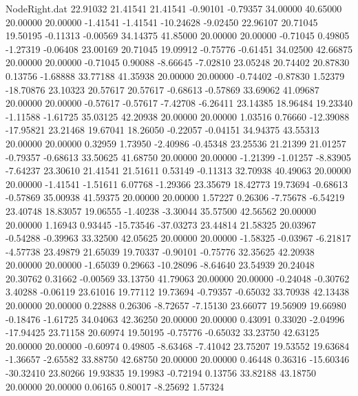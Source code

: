 \begin{filecontents}{NodeRight.dat}
  22.91032   21.41541   21.41541    -0.90101   -0.79357   34.00000   40.65000   20.00000   20.00000   -1.41541   -1.41541  -10.24628   -9.02450
  22.96107   20.71045   19.50195    -0.11313   -0.00569   34.14375   41.85000   20.00000   20.00000   -0.71045    0.49805   -1.27319   -0.06408
  23.00169   20.71045   19.09912    -0.75776   -0.61451   34.02500   42.66875   20.00000   20.00000   -0.71045    0.90088   -8.66645   -7.02810
  23.05248   20.74402   20.87830     0.13756   -1.68888   33.77188   41.35938   20.00000   20.00000   -0.74402   -0.87830    1.52379  -18.70876
  23.10323   20.57617   20.57617    -0.68613   -0.57869   33.69062   41.09687   20.00000   20.00000   -0.57617   -0.57617   -7.42708   -6.26411
  23.14385   18.96484   19.23340    -1.11588   -1.61725   35.03125   42.20938   20.00000   20.00000    1.03516    0.76660  -12.39088  -17.95821
  23.21468   19.67041   18.26050    -0.22057   -0.04151   34.94375   43.55313   20.00000   20.00000    0.32959    1.73950   -2.40986   -0.45348
  23.25536   21.21399   21.01257    -0.79357   -0.68613   33.50625   41.68750   20.00000   20.00000   -1.21399   -1.01257   -8.83905   -7.64237
  23.30610   21.41541   21.51611     0.53149   -0.11313   32.70938   40.49063   20.00000   20.00000   -1.41541   -1.51611    6.07768   -1.29366
  23.35679   18.42773   19.73694    -0.68613   -0.57869   35.00938   41.59375   20.00000   20.00000    1.57227    0.26306   -7.75678   -6.54219
  23.40748   18.83057   19.06555    -1.40238   -3.30044   35.57500   42.56562   20.00000   20.00000    1.16943    0.93445  -15.73546  -37.03273
  23.44814   21.58325   20.03967    -0.54288   -0.39963   33.32500   42.05625   20.00000   20.00000   -1.58325   -0.03967   -6.21817   -4.57738
  23.49879   21.65039   19.70337    -0.90101   -0.75776   32.35625   42.20938   20.00000   20.00000   -1.65039    0.29663  -10.28096   -8.64640
  23.54939   20.24048   20.30762     0.31662   -0.00569   33.13750   41.79063   20.00000   20.00000   -0.24048   -0.30762    3.40288   -0.06119
  23.61016   19.77112   19.73694    -0.79357   -0.65032   33.70938   42.13438   20.00000   20.00000    0.22888    0.26306   -8.72657   -7.15130
  23.66077   19.56909   19.66980    -0.18476   -1.61725   34.04063   42.36250   20.00000   20.00000    0.43091    0.33020   -2.04996  -17.94425
  23.71158   20.60974   19.50195    -0.75776   -0.65032   33.23750   42.63125   20.00000   20.00000   -0.60974    0.49805   -8.63468   -7.41042
  23.75207   19.53552   19.63684    -1.36657   -2.65582   33.88750   42.68750   20.00000   20.00000    0.46448    0.36316  -15.60346  -30.32410
  23.80266   19.93835   19.19983    -0.72194    0.13756   33.82188   43.18750   20.00000   20.00000    0.06165    0.80017   -8.25692    1.57324

\end{filecontents}
